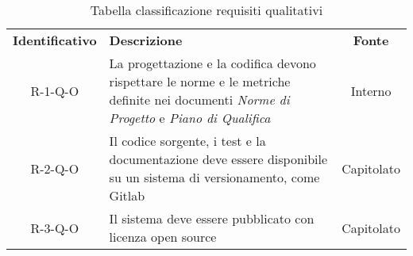 \renewcommand{\arraystretch}{1.5}
\begin{longtable}{ c C{9cm} c }
    \caption{Tabella classificazione requisiti qualitativi}\\
    \rowcolor{\primaryColor}
    \textcolor{\secondaryColor}{
    \textbf{Identificativo}} & \textcolor{\secondaryColor}{\textbf{Descrizione}}                                                            & \textcolor{\secondaryColor}
    {\textbf{Fonte}}                                                                                                                                                      \\


    R-1-Q-O     & La progettazione e la codifica devono rispettare le norme e le metriche definite nei documenti \emph{Norme di Progetto} e \emph{Piano di Qualifica} & Interno\\
    R-2-Q-O     & Il codice sorgente, i test e la documentazione deve essere disponibile su un sistema di versionamento, come Gitlab & Capitolato\\
    R-3-Q-O     & Il sistema deve essere pubblicato con licenza open source & Capitolato\\

\end{longtable}